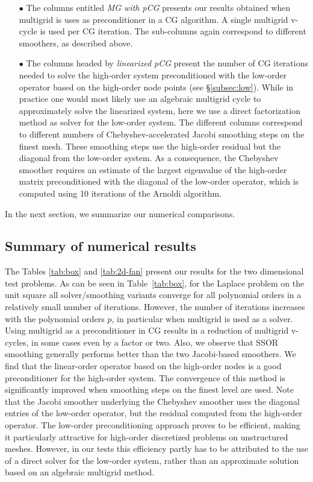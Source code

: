 \documentclass[smallcondensed,final]{svjour3}     %
\begin{document}
\begin{itemize}
\item[$\bullet$] The columns entitled \emph{MG with pCG} presents our
  results obtained when multigrid is uses as preconditioner in a CG
  algorithm. A single multigrid v-cycle is used per CG iteration. The sub-columns 
  again correspond to different smoothers, as described above.
\item[$\bullet$] The columns headed by \emph{linearized pCG} present
  the number of CG iterations needed to solve the high-order system
  preconditioned with the low-order operator based on the high-order
  node points (see \S\ref{subsec:low}). While in practice one
  would most likely use an algebraic multigrid cycle to approximately
  solve the linearized system, here we use a direct factorization
  method as solver for the low-order system. The different columns
  correspond to different numbers of Chebyshev-accelerated Jacobi
  smoothing steps on the finest mesh. These smoothing steps use the
  high-order residual but the diagonal from the low-order system. As a
  consequence, the Chebyshev smoother requires an estimate of the
  largest eigenvalue of the high-order matrix preconditioned with the
  diagonal of the low-order operator, which is computed using
  10 iterations of the Arnoldi algorithm.
\end{itemize}
In the next section, we summarize our numerical comparisons.

\subsection{Summary of numerical results}\label{subsec:results}
The Tables \ref{tab:box} and \ref{tab:2d-fan} present our results for
the two dimensional test problems. As can be seen in
Table~\ref{tab:box}, for the Laplace problem on the unit square all
solver/smoothing variants converge for all polynomial orders in a
relatively small number of iterations. However, the number of
iterations increases with the polynomial orders $p$, in particular
when multigrid is used as a solver. Using multigrid as a
preconditioner in CG results in a reduction of multigrid v-cycles, in
some cases even by a factor or two. Also, we observe that SSOR
smoothing generally performs better than the two Jacobi-based
smoothers. We find that the linear-order operator based on the
high-order nodes is a good preconditioner for the high-order
system. The convergence of this method is significantly improved when
smoothing steps on the finest level are used. Note that the Jacobi
smoother underlying the Chebyshev smoother uses the diagonal entries
of the low-order operator, but the residual computed from the
high-order operator. The low-order preconditioning approach proves to
be efficient, making it particularly attractive for high-order
discretized problems on unstructured meshes. However, in our tests
this efficiency partly has to be attributed to the use of a direct
solver for the low-order system, rather than an approximate solution
based on an algebraic multigrid method.
\end{document}

